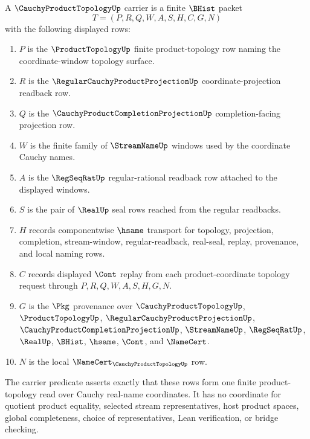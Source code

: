 \begin{definition}
\label{def:cauchy-product-topology-carrier}
A $\CauchyProductTopologyUp$ carrier is a finite $\BHist$ packet
$$
T=(P,R,Q,W,A,S,H,C,G,N)
$$
with the following displayed rows:
\begin{enumerate}
\item $P$ is the $\ProductTopologyUp$ finite product-topology row naming the coordinate-window topology surface.
\item $R$ is the $\RegularCauchyProductProjectionUp$ coordinate-projection readback row.
\item $Q$ is the $\CauchyProductCompletionProjectionUp$ completion-facing projection row.
\item $W$ is the finite family of $\StreamNameUp$ windows used by the coordinate Cauchy names.
\item $A$ is the $\RegSeqRatUp$ regular-rational readback row attached to the displayed windows.
\item $S$ is the pair of $\RealUp$ seal rows reached from the regular readbacks.
\item $H$ records componentwise $\hsame$ transport for topology, projection, completion, stream-window, regular-readback, real-seal, replay, provenance, and local naming rows.
\item $C$ records displayed $\Cont$ replay from each product-coordinate topology request through $P,R,Q,W,A,S,H,G,N$.
\item $G$ is the $\Pkg$ provenance over $\CauchyProductTopologyUp$, $\ProductTopologyUp$, $\RegularCauchyProductProjectionUp$, $\CauchyProductCompletionProjectionUp$, $\StreamNameUp$, $\RegSeqRatUp$, $\RealUp$, $\BHist$, $\hsame$, $\Cont$, and $\NameCert$.
\item $N$ is the local $\NameCert_{\CauchyProductTopologyUp}$ row.
\end{enumerate}
The carrier predicate asserts exactly that these rows form one finite product-topology read over Cauchy real-name coordinates. It has no coordinate for quotient product equality, selected stream representatives, host product spaces, global completeness, choice of representatives, Lean verification, or bridge checking.
\end{definition}

